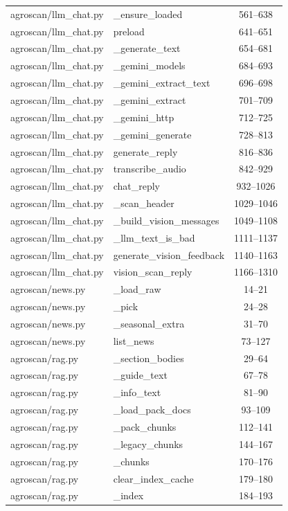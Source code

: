 \begin{center}
\begin{longtable}{@{}p{4.6cm}p{5.2cm}c@{}}
agroscan/llm\_chat.py & \_ensure\_loaded & 561--638 \\
agroscan/llm\_chat.py & preload & 641--651 \\
agroscan/llm\_chat.py & \_generate\_text & 654--681 \\
agroscan/llm\_chat.py & \_gemini\_models & 684--693 \\
agroscan/llm\_chat.py & \_gemini\_extract\_text & 696--698 \\
agroscan/llm\_chat.py & \_gemini\_extract & 701--709 \\
agroscan/llm\_chat.py & \_gemini\_http & 712--725 \\
agroscan/llm\_chat.py & \_gemini\_generate & 728--813 \\
agroscan/llm\_chat.py & generate\_reply & 816--836 \\
agroscan/llm\_chat.py & transcribe\_audio & 842--929 \\
agroscan/llm\_chat.py & chat\_reply & 932--1026 \\
agroscan/llm\_chat.py & \_scan\_header & 1029--1046 \\
agroscan/llm\_chat.py & \_build\_vision\_messages & 1049--1108 \\
agroscan/llm\_chat.py & \_llm\_text\_is\_bad & 1111--1137 \\
agroscan/llm\_chat.py & generate\_vision\_feedback & 1140--1163 \\
agroscan/llm\_chat.py & vision\_scan\_reply & 1166--1310 \\
agroscan/news.py & \_load\_raw & 14--21 \\
agroscan/news.py & \_pick & 24--28 \\
agroscan/news.py & \_seasonal\_extra & 31--70 \\
agroscan/news.py & list\_news & 73--127 \\
agroscan/rag.py & \_section\_bodies & 29--64 \\
agroscan/rag.py & \_guide\_text & 67--78 \\
agroscan/rag.py & \_info\_text & 81--90 \\
agroscan/rag.py & \_load\_pack\_docs & 93--109 \\
agroscan/rag.py & \_pack\_chunks & 112--141 \\
agroscan/rag.py & \_legacy\_chunks & 144--167 \\
agroscan/rag.py & \_chunks & 170--176 \\
agroscan/rag.py & clear\_index\_cache & 179--180 \\
agroscan/rag.py & \_index & 184--193 \\

\end{longtable}
\end{center}
